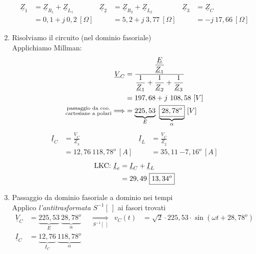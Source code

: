 \documentclass{article}
\begin{document}
\begin{enumerate}[label=\protect\circled{\arabic*}]
\begin{center}
    \end{center}
    \begin{align*}
        \underline{Z}_1 &= \underline{Z}_{R_1} + \underline{Z}_{L_1} &
        \underline{Z}_2 &= \underline{Z}_{R_2} + \underline{Z}_{L_2} &
        \underline{Z}_3 &= \underline{Z}_C
        \\
        &=0,1 +j \ 0,2 \ [\Omega] &
        &= 5,2 + j \ 3,77 \ [\Omega] &
        &= - j\ 17,66 \ [\Omega]
    \end{align*}
    \item Risolviamo il circuito (nel dominio fasoriale)
    \vspace*{0.2cm}\\
    Applichiamo Millman:
    \begin{align*}
        \underline{V}_C &= \frac{\dfrac{\underline{E}}{\underline{Z}_1}}{\dfrac{1}{\underline{Z}_1} + \dfrac{1}{\underline{Z}_2} + \dfrac{1}{\underline{Z}_3}} \\
        &=197,68 + j \ 108,58 \ [V]\\
        \substack{\text{passaggio da coo.} \\ \text{cartesiane a polari}} \Longrightarrow&=\underbrace{225,53}_{E} \ \underbrace{\boxed{28,78 ^o}}_{\alpha} \ [V]
    \end{align*}
    \begin{align*}
        \underline{I}_C &= \frac{\underline{V}_C}{\underline{Z}_3} &
        \underline{I}_L &= \frac{\underline{V}_C}{\underline{Z}_2}
        \\
        &= 12,76 \ \boxed{118,78^o} \ [A] &
        &= 35,11 \ \boxed{-7,16^o} \ [A]
    \end{align*}
    \begin{align*}
        \text{LKC:} \ \underline{I}_e &= \underline{I}_C + \underline{I}_L\\
        &=29,49 \ \boxed{13,34^o}
    \end{align*}
    \item Passaggio da dominio fasoriale a dominio nei tempi
    \vspace*{0.2cm}\\
    Applico \textit{l'antitrasformata} $S^{-1}[ \ ]$ ai fasori trovati
    \begin{align*}
        \underline{V}_C &= \underbrace{225,53}_{E} \ \underbrace{\boxed{28,78 ^o}}_{\alpha} &
        &\underset{S^{-1} [\ ]}{\Longrightarrow} &
        v_C(t) &=\sqrt{2} \cdot 225,53 \cdot \sin(\omega t + 28,78 ^o)
        \\
        \underline{I}_C &= \underbrace{12,76}_{I_C} \ \underbrace{\boxed{118,78 ^o}}_{\alpha} &

\end{align*}
\end{enumerate}
\end{document}
